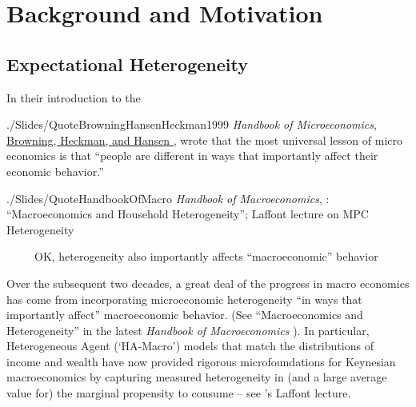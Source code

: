 \section{Background and Motivation}\label{motivation-and-context}


\subsection{Expectational Heterogeneity}\label{EpiExpHet}\hypertarget{EpiExpHet}{}

In their introduction to the
\begin{verbatimwrite}{./Slides/QuoteBrowningHansenHeckman1999}%
    \textit{Handbook of Microeconomics}, \href{http://larspeterhansen.org/wp-content/uploads/2016/11/Microdata-and-GE-Models.pdf}{Browning, Heckman, and Hansen \citeyear{browning_chapter_1999}}, wrote that the most universal lesson of micro economics is that ``people are different in ways that importantly affect their economic behavior.''
\end{verbatimwrite}%

\begin{verbatimwrite}{./Slides/QuoteHandbookOfMacro}
\textit{Handbook of Macroeconomics}, \cite{kmpHandbook}: ``Macroeconomics and Household Heterogeneity'';  \cite{violante_marginal_2021} Laffont lecture on MPC Heterogeneity

\pause \indent ~~~~~OK, heterogeneity also importantly affects ``macroeconomic'' behavior

\end{verbatimwrite}

    Over the subsequent two decades, a great deal of the progress in macro economics has come from incorporating microeconomic heterogeneity ``in ways that importantly affect'' macroeconomic behavior.  (See ``Macroeconomics and Heterogeneity'' in the latest \textit{Handbook of Macroeconomics} \cite{kmpHandbook}).  In particular, Heterogeneous Agent  (`HA-Macro') models that match the distributions of income and wealth
    have now provided rigorous microfoundations for Keynesian macroeconomics by capturing measured heterogeneity in (and a large average value for) the marginal propensity to consume -- see \cite{violante_marginal_2021}'s Laffont lecture.

